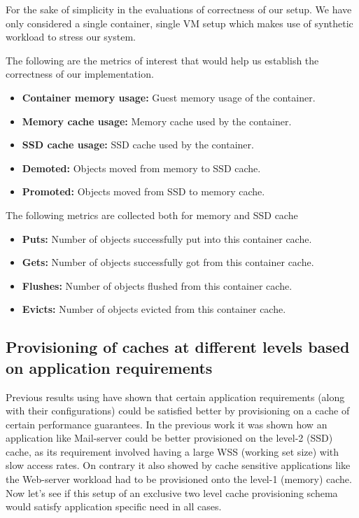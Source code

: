 	  For the sake of simplicity in the evaluations of correctness of our setup. We have only considered a single container, single VM setup 
	  which makes use of synthetic workload to stress our system.
	
	The following are the metrics of interest that would help us establish the correctness of our implementation.
	  
	  \begin{itemize}
	   
	   \item \textbf{Container memory usage:} Guest memory usage of the container.
	   \item \textbf{Memory cache usage:} Memory cache used by the container.
	   \item \textbf{SSD cache usage:} SSD cache used by the container.
	   
	   \item \textbf{Demoted:} Objects moved from memory to SSD cache.
	   \item \textbf{Promoted:} Objects moved from SSD to memory cache.
	   
	  \end{itemize}	  
	  
	  The following metrics are collected both for memory and SSD cache
	  
	  \begin{itemize}
	   
	   \item \textbf{Puts:} Number of objects successfully put into this container cache.
	   \item \textbf{Gets:} Number of objects successfully got from this container cache.
	   \item \textbf{Flushes:} Number of objects flushed from this container cache.
	   \item \textbf{Evicts:} Number of objects evicted from this container cache.
	   
	  \end{itemize}
  
    \subsection{Provisioning of caches at different levels based on application requirements}
      Previous results using \dd{}\cite{doubledecker} have shown that certain application requirements 
      (along with their configurations) could be satisfied better by provisioning on a cache of certain 
      performance guarantees. In the previous work\cite{doubledecker} it was shown how an application like 
      Mail-server could be better provisioned on the level-2 (SSD) cache, as its requirement involved 
      having a large WSS (working set size) with slow access rates. On contrary it also showed by cache sensitive 
      applications like the Web-server workload had to be provisioned onto the level-1 (memory) cache. 
      Now let's see if this setup of an exclusive two level cache provisioning schema would satisfy application
      specific need in all cases.
	
